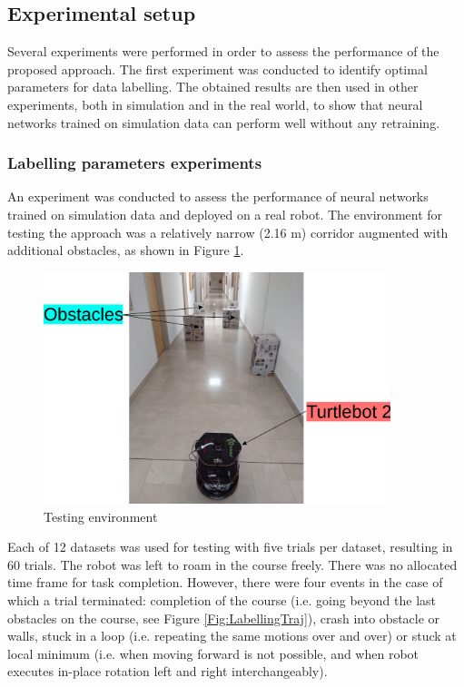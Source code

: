 \subsection{Experimental setup}

Several experiments were performed in order to assess the performance of the proposed approach. The first experiment was conducted to identify optimal parameters for data labelling. The obtained results are then used in other experiments, both in simulation and in the real world, to show that neural networks trained on simulation data can perform well without any retraining. %

\subsubsection{Labelling parameters experiments}
\label{Sec:MMLabelling}

An experiment was conducted to assess the performance of neural networks trained on simulation data and deployed on a real robot. The environment for testing the approach was a relatively narrow (2.16 m) corridor augmented with additional obstacles, as shown in Figure \ref{Fig:Hodnik}.

\begin{figure}
\centering
\includegraphics[width=0.9\textwidth]{slike/hodnik}
\caption{Testing environment}
\label{Fig:Hodnik}
\end{figure}

Each of 12 datasets was used for testing with five trials per dataset, resulting in 60 trials. The robot was left to roam in the course freely. There was no allocated time frame for task completion. However, there were four events in the case of which a trial terminated: completion of the course (i.e. going beyond the last obstacles on the course, see Figure \ref{Fig:LabellingTraj}), crash into obstacle or walls, stuck in a loop (i.e. repeating the same motions over and over) or stuck at local minimum (i.e. when moving forward is not possible, and when robot executes in-place rotation left and right interchangeably).

